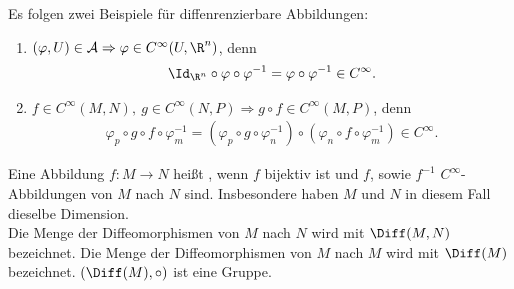\begin{bsp}
  Es folgen zwei Beispiele für diffenrenzierbare Abbildungen:
  \begin{enumerate}
  \item $(\varphi,U) \in \mathcal A \Rightarrow \varphi \in C^{\infty}(U,\R^n)$, denn
    \begin{align*}
      \Id_{\R^n}\circ \varphi \circ \varphi^{-1} = \varphi \circ \varphi^{-1} \in C^{\infty}.
    \end{align*}
  \item $f \in C^{\infty}(M,N), \ g \in C^{\infty}(N,P) \Rightarrow g \circ f \in C^{\infty}(M,P)$, denn
    \begin{align*}
      \varphi_p \circ g \circ f \circ \varphi^{-1}_m = (\varphi_p \circ g \circ \varphi_n^{-1}) \circ (\varphi_n \circ f \circ \varphi_m^{-1}) \in C^{\infty}.
    \end{align*}
  \end{enumerate}
\end{bsp}

\begin{dfn}[Diffeomorphismus]
  Eine Abbildung $f \colon M \to N$ heißt , wenn $f$ bijektiv ist und $f$, sowie $f^{-1}$ $C^{\infty}$-Abbildungen von $M$ nach $N$ sind. Insbesondere haben $M$ und $N$ in diesem Fall dieselbe Dimension.\\

Die Menge der Diffeomorphismen von $M$ nach $N$ wird mit $\Diff(M,N)$ bezeichnet. Die Menge der Diffeomorphismen von $M$ nach $M$ wird mit $\Diff(M)$ bezeichnet. $(\Diff(M), \circ)$ ist eine Gruppe.

\end{dfn}

